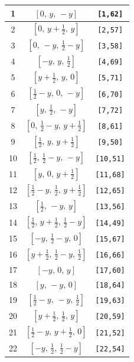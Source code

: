 \documentclass[fleqn,8pt]{jsarticle}
\begin{document}
\begin{longtable}{ccc}
1 & $\left[ 0,\, y,\, - y \right]$ & {\tt [1,62]} \\ \hline
2 & $\left[ 0,\, y + \frac{1}{2},\, y \right]$ & {\tt [2,57]} \\ \hline
3 & $\left[ 0,\, - y,\, \frac{1}{2} - y \right]$ & {\tt [3,58]} \\ \hline
4 & $\left[ - y,\, y,\, \frac{1}{2} \right]$ & {\tt [4,69]} \\ \hline
5 & $\left[ y + \frac{1}{2},\, y,\, 0 \right]$ & {\tt [5,71]} \\ \hline
6 & $\left[ \frac{1}{2} - y,\, 0,\, - y \right]$ & {\tt [6,70]} \\ \hline
7 & $\left[ y,\, \frac{1}{2},\, - y \right]$ & {\tt [7,72]} \\ \hline
8 & $\left[ 0,\, \frac{1}{2} - y,\, y + \frac{1}{2} \right]$ & {\tt [8,61]} \\ \hline
9 & $\left[ \frac{1}{2},\, y,\, y + \frac{1}{2} \right]$ & {\tt [9,50]} \\ \hline
10 & $\left[ \frac{1}{2},\, \frac{1}{2} - y,\, - y \right]$ & {\tt [10,51]} \\ \hline
11 & $\left[ y,\, 0,\, y + \frac{1}{2} \right]$ & {\tt [11,68]} \\ \hline
12 & $\left[ \frac{1}{2} - y,\, \frac{1}{2},\, y + \frac{1}{2} \right]$ & {\tt [12,65]} \\ \hline
13 & $\left[ \frac{1}{2},\, - y,\, y \right]$ & {\tt [13,56]} \\ \hline
14 & $\left[ \frac{1}{2},\, y + \frac{1}{2},\, \frac{1}{2} - y \right]$ & {\tt [14,49]} \\ \hline
15 & $\left[ - y,\, \frac{1}{2} - y,\, 0 \right]$ & {\tt [15,67]} \\ \hline
16 & $\left[ y + \frac{1}{2},\, \frac{1}{2} - y,\, \frac{1}{2} \right]$ & {\tt [16,66]} \\ \hline
17 & $\left[ - y,\, 0,\, y \right]$ & {\tt [17,60]} \\ \hline
18 & $\left[ y,\, - y,\, 0 \right]$ & {\tt [18,64]} \\ \hline
19 & $\left[ \frac{1}{2} - y,\, - y,\, \frac{1}{2} \right]$ & {\tt [19,63]} \\ \hline
20 & $\left[ y + \frac{1}{2},\, \frac{1}{2},\, y \right]$ & {\tt [20,59]} \\ \hline
21 & $\left[ \frac{1}{2} - y,\, y + \frac{1}{2},\, 0 \right]$ & {\tt [21,52]} \\ \hline
22 & $\left[ - y,\, \frac{1}{2},\, \frac{1}{2} - y \right]$ & {\tt [22,54]} \\ \hline

\end{longtable}
\end{document}
